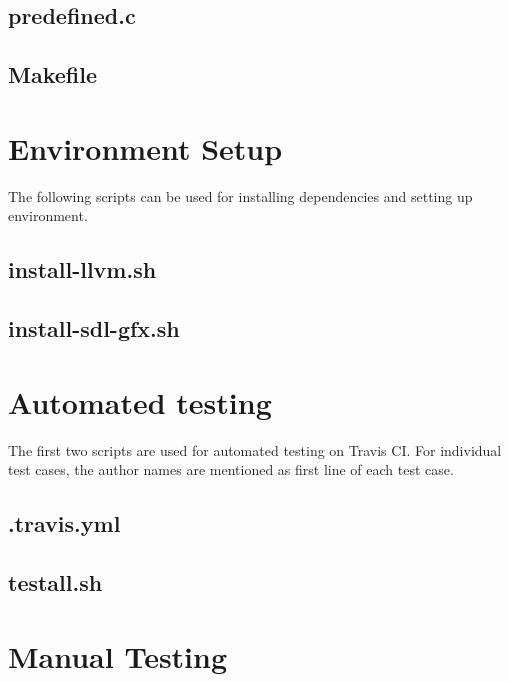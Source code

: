 \documentclass[letterpaper,12pt]{report}
\begin{document}
\begin{appendices}
    \section{predefined.c}
    

    \section{Makefile}
    


\chapter{Environment Setup}

The following scripts can be used for installing dependencies and setting up environment.

    \section{install-llvm.sh}
    

    \section{install-sdl-gfx.sh}
    

\chapter{Automated testing}\label{test-suite}

The first two scripts are used for automated testing on Travis CI. For individual test cases, the author names are mentioned as first line of each test case.

    \section{.travis.yml}
    

    \section{testall.sh}
    

    

\chapter{Manual Testing}\label{mnl-test}

  

\end{appendices}
\end{document}
